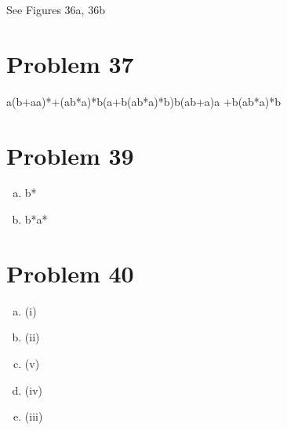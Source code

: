 \documentclass[11pt]{article}
\begin{document}
See Figures 36a, 36b

\section*{Problem 37}

a(b+aa)*+(ab*a)*b(a+b(ab*a)*b)b(ab+a)a +b(ab*a)*b

\section*{Problem 39}

\begin{enumerate}[(a)]
	\item b*
	\item b*a*
	
\end{enumerate}

\section*{Problem 40}

\begin{enumerate}[(a)]
	\item (i)
	\item (ii)
	\item (v)
	\item (iv)
	\item (iii)
	
\end{enumerate}
\end{document}
